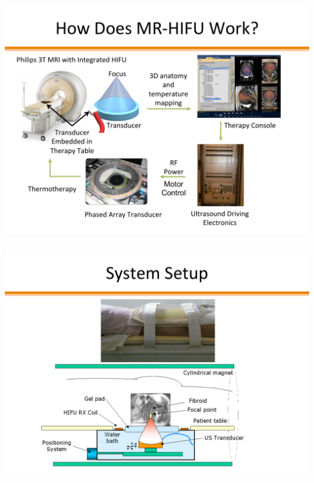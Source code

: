 \documentclass{beamer}
\begin{document}
\begin{frame}
\frametitle{}
\begin{center}
\includegraphics[scale=0.4]{Pages/MR-HIFU11a.pdf}
\end{center}
\end{frame}
\begin{frame}
\frametitle{}
\begin{center}
\includegraphics[scale=0.4]{Pages/MR-HIFU12a.pdf}
\end{center}
\end{frame}
\end{document}

